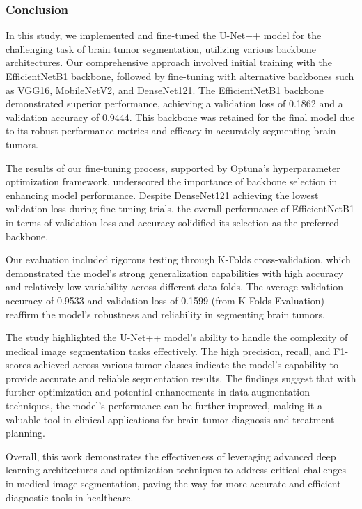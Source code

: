 \subsubsection{Conclusion}\label{s:conclusion}

In this study, we implemented and fine-tuned the U-Net++ model for the challenging task of brain tumor segmentation, utilizing various backbone architectures. Our comprehensive approach involved initial training with the EfficientNetB1 backbone, followed by fine-tuning with alternative backbones such as VGG16, MobileNetV2, and DenseNet121. The EfficientNetB1 backbone demonstrated superior performance, achieving a validation loss of 0.1862 and a validation accuracy of 0.9444. This backbone was retained for the final model due to its robust performance metrics and efficacy in accurately segmenting brain tumors.

The results of our fine-tuning process, supported by Optuna's hyperparameter optimization framework, underscored the importance of backbone selection in enhancing model performance. Despite DenseNet121 achieving the lowest validation loss during fine-tuning trials, the overall performance of EfficientNetB1 in terms of validation loss and accuracy solidified its selection as the preferred backbone.

Our evaluation included rigorous testing through K-Folds cross-validation, which demonstrated the model's strong generalization capabilities with high accuracy and relatively low variability across different data folds. The average validation accuracy of 0.9533 and validation loss of 0.1599 (from K-Folds Evaluation) reaffirm the model's robustness and reliability in segmenting brain tumors.

The study highlighted the U-Net++ model's ability to handle the complexity of medical image segmentation tasks effectively. The high precision, recall, and F1-scores achieved across various tumor classes indicate the model's capability to provide accurate and reliable segmentation results. The findings suggest that with further optimization and potential enhancements in data augmentation techniques, the model's performance can be further improved, making it a valuable tool in clinical applications for brain tumor diagnosis and treatment planning.

Overall, this work demonstrates the effectiveness of leveraging advanced deep learning architectures and optimization techniques to address critical challenges in medical image segmentation, paving the way for more accurate and efficient diagnostic tools in healthcare.


